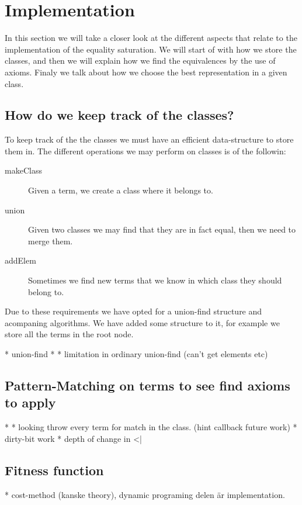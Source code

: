 
\section{Implementation}
In this section we will take a closer look at the different aspects that relate
to the implementation of the equality saturation. We will start of with how
we store the classes, and then we will explain how we find the equivalences by 
the use of axioms. Finaly we talk about how we choose the best representation in
a given class.
\subsection{How do we keep track of the classes?}
To keep track of the the classes we must have an efficient data-structure to store
them in. The different operations we may perform on classes is of the followin:

\begin{description}
  \item[makeClass] Given a term, we create a class where it belongs to.
  \item[union]     Given two classes we may find that they are in fact equal, then
                   we need to merge them.
  \item[addElem]   Sometimes we find new terms that we know in which class they
                   should belong to.
\end{description}

Due to these requirements we have opted for a union-find structure and acompaning
algorithms. We have added some structure to it, for example we store all the terms
in the root node.

* union-find
* * limitation in ordinary union-find (can't get elements etc)
\subsection{Pattern-Matching on terms to see find axioms to apply}
* * looking throw every term for match in the class. (hint callback future work) 
* dirty-bit work
  * depth of change in <|
\subsection{Fitness function}
* cost-method (kanske theory), dynamic programing delen är implementation.
